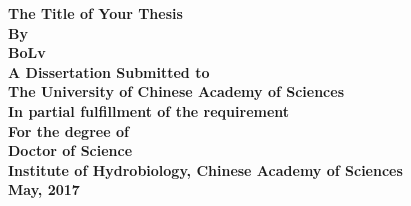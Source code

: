 \begin{titlepage}
\vspace*{20mm}
\centering
\large
\textbf{
The Title of Your Thesis\\[40mm]
By\\
Bo\quad Lv\\[30mm]
A Dissertation Submitted to\\
The University of Chinese Academy of Sciences\\
In partial fulfillment of the requirement\\
For the degree of\\
Doctor of Science\\
\vspace{20mm}
Institute of Hydrobiology, Chinese Academy of Sciences\\
May, 2017
}
\end{titlepage}

\vspace*{10mm}
\thispagestyle{empty}




